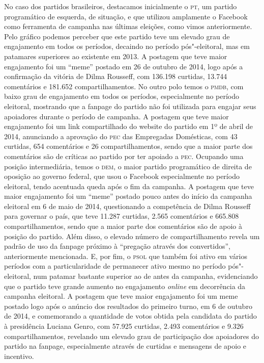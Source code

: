 No caso dos partidos brasileiros, destacamos inicialmente o \textsc{pt}, um
partido programático de esquerda, de situação, e que utilizou amplamente
o Facebook como ferramenta de campanha nas últimas eleições, como vimos
anteriormente. Pelo gráfico podemos perceber que este partido teve um
elevado grau de engajamento em todos os períodos, decaindo no período
pós"-eleitoral, mas em patamares superiores ao existente em 2013. A
postagem que teve maior engajamento foi um ``meme'' postado em
26 de outubro de 2014, logo após a confirmação da vitória de Dilma Rousseff, com
136.198 curtidas, 13.744 comentários e 181.652 compartilhamentos. No
outro polo temos o \textsc{pmdb}, com baixo grau de engajamento em todos os
períodos, especialmente no período eleitoral, mostrando que a fanpage do
partido não foi utilizada para engajar seus apoiadores durante o período
de campanha. A postagem que teve maior engajamento foi um link
compartilhado do website do partido em 1º de abril de 2014, anunciando a
aprovação do \textsc{pec} das Empregadas Domésticas, com 43 curtidas, 654
comentários e 26 compartilhamentos, sendo que a maior parte dos
comentários são de críticas ao partido por ter apoiado a \textsc{pec}. Ocupando
uma posição intermediária, temos o \textsc{dem}, o maior partido programático de
direita de oposição ao governo federal, que usou o Facebook
especialmente no período eleitoral, tendo acentuada queda após o fim da
campanha. A postagem que teve maior engajamento foi um ``meme'' postado
pouco antes do início da campanha eleitoral em 6 de maio de 2014, questionando
a competência de Dilma Rousseff para governar o país, que teve 11.287
curtidas, 2.565 comentários e 665.808 compartilhamentos, sendo que a
maior parte dos comentários são de apoio à posição do partido. Além
disso, o elevado número de compartilhamento revela um padrão de uso da
fanpage próximo à ``pregação através dos convertidos'', anteriormente
mencionada. E, por fim, o \textsc{psol} que também foi ativo em vários períodos
com a particularidade de permanecer ativo mesmo no período
pós"-eleitoral, num patamar bastante superior ao de antes da campanha,
evidenciando que o partido teve grande aumento no engajamento \emph{online} em
decorrência da campanha eleitoral. A postagem que teve maior engajamento
foi um meme postado logo após o anúncio dos resultados do primeiro
turno, em 6 de outubro de 2014, e comemorando a quantidade de votos obtida pela
candidata do partido à presidência Luciana Genro, com 57.925 curtidas,
2.493 comentários e 9.326 compartilhamentos, revelando um
elevado grau de participação dos apoiadores do partido na fanpage,
especialmente através de curtidas e mensagens de apoio e incentivo.

